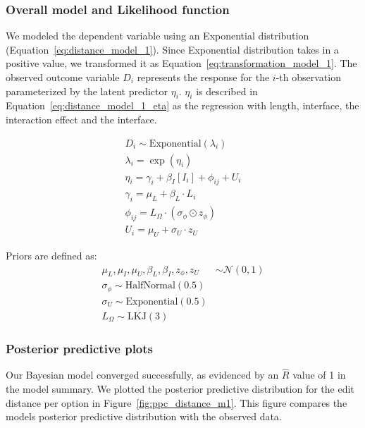 \subsubsection{Overall model and Likelihood function}
We modeled the dependent variable using an Exponential distribution (Equation~\ref{eq:distance_model_1}). Since Exponential distribution takes in a positive value, we transformed it as Equation~\ref{eq:transformation_model_1}. The observed outcome variable $D_i$ represents the response for the $i$-th observation parameterized by the latent predictor $\eta_i$. $\eta_i$ is described in Equation~\ref{eq:distance_model_1_eta} as the regression with length, interface, the interaction effect and the interface.

\begin{align}
    D_i \sim \text{Exponential}(\lambda_i) \label{eq:distance_model_1} \\
    \lambda_i = \exp(\eta_i) \label{eq:transformation_model_1}\\
    \eta_i = \gamma_i + \beta_I[I_i] + \phi_{ij} + U_i \label{eq:distance_model_1_eta} \\
    \gamma_i = \mu_L + \beta_L \cdot L_i \label{eq:distance_model_1_eta_ordinal} \\
    \phi_{ij} = L_{\Omega} \cdot (\sigma_{\phi} \odot z_{\phi}) \label{eq:distance_model_1_lkj} \\
    U_i = \mu_U + \sigma_U \cdot z_U \label{eq:distance_model_1_user_effect}
\end{align}

Priors are defined as:
\begin{align}
    \mu_L, \mu_I, \mu_U, \beta_L, \beta_I, z_{\phi}, z_U &\sim \mathcal{N}(0, 1) \label{eq:priors_global_mean} \\
    \sigma_{\phi} \sim \text{HalfNormal}(0.5) \label{eq:priors_sigma_phi} \\
    \sigma_U \sim \text{Exponential}(0.5) \label{eq:priors_sigma_U} \\
    L_{\Omega} \sim \text{LKJ}(3) \label{eq:priors_L_Omega}
\end{align}

\subsubsection{Posterior predictive plots}
Our Bayesian model converged successfully, as evidenced by an $\hat{R}$ value of 1 in the model summary. We plotted the posterior predictive distribution for the edit distance per option in Figure~\ref{fig:ppc_distance_m1}. This figure compares the models posterior predictive distribution with the observed data. 

